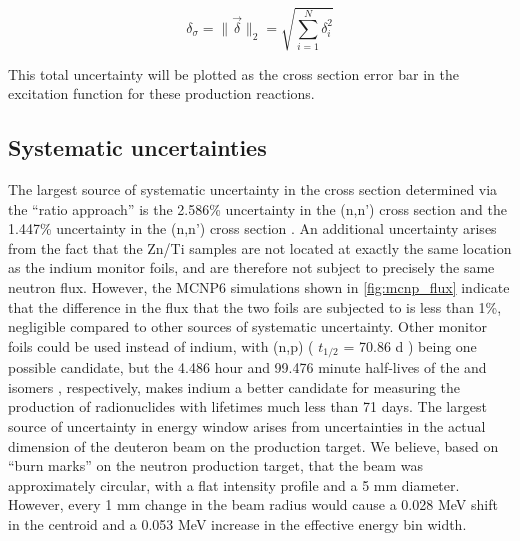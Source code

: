 \documentclass[5p]{elsarticle}
\newcommand{\norm}[1]{\lVert #1 \rVert}
\begin{document}
\begin{equation}
\delta_\sigma = \norm{ \ensuremath{\vec{\delta}} }_2 = \sqrt{\sum_{i=1}^N  \delta_i^2  }
\end{equation}

This total  uncertainty will be plotted as the cross section error bar in the excitation function for these production reactions.



\subsection{Systematic uncertainties}

The largest source of systematic uncertainty in the cross section determined via the \enquote{ratio approach} is the 2.586\% uncertainty in the (n,n')  cross section and the 1.447\% uncertainty in the (n,n')  cross section  \cite{Capote2012,zsolnay2012technical}.
 An additional uncertainty arises from the fact that the Zn/Ti samples are not located at exactly the same location as the indium monitor foils, and are therefore not subject to precisely the same neutron flux.
 However, the MCNP6 simulations shown in \autoref{fig:mcnp_flux} indicate that the difference in the flux that the two foils are subjected to is less than 1\%, negligible compared to other sources of systematic uncertainty.
 Other monitor foils could be used instead of indium, with (n,p) ( $t_{1/2}$ = 70.86 d \cite{Nesaraja2010}) being one possible candidate, but the 4.486 hour and 99.476 minute half-lives of the  and  isomers \cite{Blachot2012,Blachot2010a}, respectively, makes indium a better candidate for measuring the production of radionuclides with lifetimes much less than 71 days.
The largest source of uncertainty in energy window arises from uncertainties in the actual dimension of the deuteron beam on the production target.
 We believe, based on \enquote{burn marks} on the neutron production target, that the beam was approximately circular, with a flat intensity profile and a 5 mm diameter.
 However, every 1 mm change in the beam radius would cause a 0.028 MeV shift in the centroid and a 0.053 MeV increase in the effective energy bin width.
 
\end{document}
